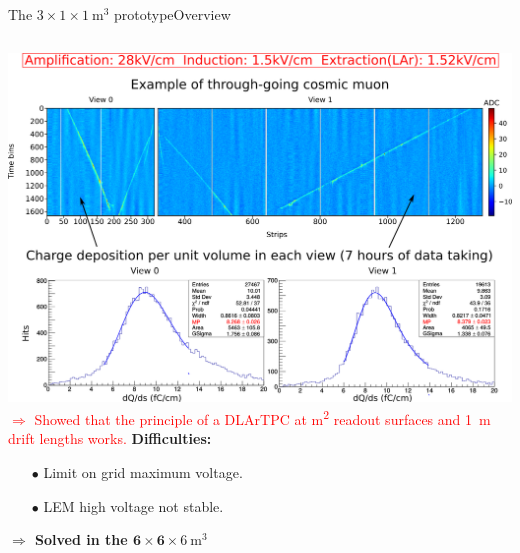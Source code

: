 \documentclass[10pt]{beamer}
\begin{document}
\begin{frame}{The \texorpdfstring{$3 \times 1 \times \SI{1}{\meter\cubed}$}{311} prototype}{Overview}
\begin{scriptsize}
\begin{columns}
\begin{column}{0.48\textwidth}
    				\includegraphics[width=\textwidth]{figures/311/run840.png}
    				\textcolor{red}{$\Rightarrow$ Showed that the principle of a DLArTPC at \si{\meter\squared} readout surfaces and \SI{1}{\meter} drift lengths works.}
    				\textbf{Difficulties:} 
    				\begin{itemize}
    					\item[$\bullet$] Limit on grid maximum voltage.
    					\item[$\bullet$] LEM high voltage not stable.
    				\end{itemize}
    				\textbf{$\Rightarrow$ Solved in the $\mathbf{6 \times 6 \times} \SI[detect-weight
    					]{6}{\meter\cubed}$}\\
    				\vspace{0.3cm}
    			\end{column}
    		\end{columns}
	    \end{scriptsize}
    \end{frame}
    
\end{document}
